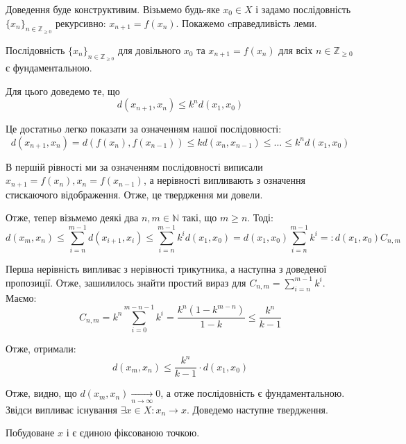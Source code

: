 \documentclass[14pt]{extarticle}
\newcommand{\<}{\langle}
\renewcommand{\>}{\rangle}
\theoremstyle{mystyle}{\newtheorem{definition}{Definition}[section]}
\theoremstyle{mystyle}{\newtheorem{proposition}[definition]{Proposition}}
\theoremstyle{mystyle}{\newtheorem{theorem}[definition]{Theorem}}
\theoremstyle{mystyle}{\newtheorem{lemma}[definition]{Lemma}}
\theoremstyle{mystyle}{\newtheorem{corollary}[definition]{Corollary}}
\theoremstyle{mystyle}{\newtheorem*{remark}{Remark}}
\theoremstyle{mystyle}{\newtheorem*{remarks}{Remarks}}
\theoremstyle{mystyle}{\newtheorem*{example}{Example}}
\theoremstyle{mystyle}{\newtheorem*{examples}{Examples}}
\theoremstyle{definition}{\newtheorem*{exercise}{Exercise}}
\theoremstyle{cstyle}{\newtheorem*{cthm}{}}
\theoremstyle{warn}
\begin{document}
Доведення буде конструктивим. Візьмемо будь-яке $x_0 \in X$ і задамо послідовність $\{x_n\}_{n \in \mathbb{Z}_{\geq 0}}$ рекурсивно: $x_{n+1} = f(x_n)$. Покажемо cправедливість леми.

\begin{lemma}
    Послідовність $\{x_n\}_{n \in \mathbb{Z}_{\geq 0}}$ для довільного $x_0$ та $x_{n+1}=f(x_n)$ для всіх $n \in \mathbb{Z}_{\geq 0}$ є фундаментальною.
\end{lemma}

Для цього доведемо те, що
    \begin{equation}
        d(x_{n+1},x_n) \leq k^nd(x_1,x_0)
    \end{equation}

Це достатньо легко показати за означенням нашої послідовності:
\begin{equation}
    d(x_{n+1},x_n) = d(f(x_n),f(x_{n-1})) \leq kd(x_n,x_{n-1}) \leq \dots \leq k^nd(x_1,x_0)
\end{equation}

В першій рівності ми за означенням послідовності виписали $x_{n+1}=f(x_n),x_n=f(x_{n-1})$, а нерівності випливають з означення стискаючого відображення. Отже, це твердження ми довели.

Отже, тепер візьмемо деякі два $n,m \in \mathbb{N}$ такі, що $m\geq n$. Тоді:
\begin{equation}
    d(x_m,x_n) \leq \sum_{i=n}^{m-1}d(x_{i+1},x_i) \leq \sum_{i=n}^{m-1}k^i d(x_1,x_0) = d(x_1,x_0)\sum_{i=n}^{m-1}k^i =: d(x_1,x_0)C_{n,m}
\end{equation}

Перша нерівність випливає з нерівності трикутника, а наступна з доведеної пропозиції. Отже, зашилилось знайти простий вираз для $C_{n,m}=\sum_{i=n}^{m-1}k^i$. Маємо:
\begin{equation}
    C_{n,m} = k^n \sum_{i=0}^{m-n-1}k^i = \frac{k^n (1 - k^{m-n})}{1-k} \leq \frac{k^n}{k-1}
\end{equation}

Отже, отримали:
\begin{equation}
    d(x_m,x_n) \leq \frac{k^n}{k-1} \cdot d(x_1,x_0)
\end{equation}

Отже, видно, що $d(x_m,x_n) \xrightarrow[n \to \infty]{}0$, а отже послідовність є фундаментальною. Звідси випливає існування $\exists x \in X: x_n \to x$. Доведемо наступне твердження.

\begin{proposition}
    Побудоване $x$ і є єдиною фіксованою точкою. 
\end{proposition}
\end{document}
